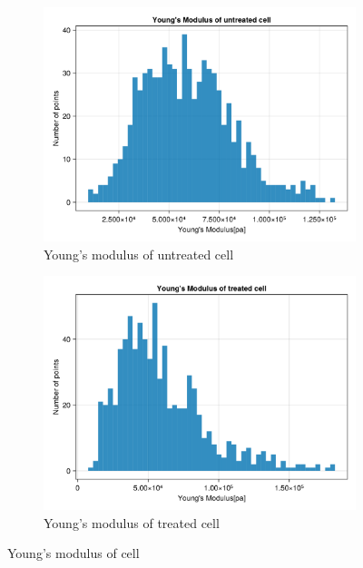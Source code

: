 \documentclass[a4paper,english,12pt,bibliography=totoc]{scrreprt}
\begin{document}
\begin{figure}[H]
    \begin{subfigure}{0.45\textwidth}
        \centering
        \includegraphics[width=\textwidth]{HistogramsAndViolinplot/histogram_of_untreated.png}
        \caption{Young's modulus of untreated cell}
        \label{fig:ym_cell_untreated}
    \end{subfigure}
    \begin{subfigure}{0.45\textwidth}
        \centering
        \includegraphics[width=\textwidth]{HistogramsAndViolinplot/histogram_of_treated.png}
        \caption{Young's modulus of treated cell}
        \label{fig:ym_cell_treated}
    \end{subfigure}
    \caption{Young's modulus of cell}
    \label{fig:ym_cell}
\end{figure}
\end{document}
